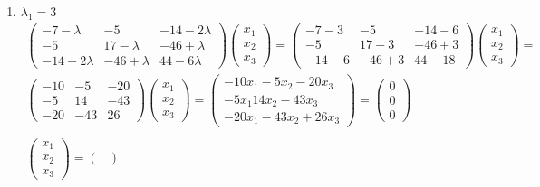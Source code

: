 		\begin{enumerate}
		\item $\lambda_1 = 3$
			\begin{gather*}
				\begin{pmatrix}
					-7-\lambda & -5 & -14-2\lambda\\
					-5 & 17-\lambda & -46+\lambda\\
					-14-2\lambda & -46+\lambda & 44-6\lambda
				\end{pmatrix}	
				\begin{pmatrix}
					x_1 \\ x_2 \\ x_3
				\end{pmatrix}
				=
				\begin{pmatrix}
					-7-3 & -5 & -14-6\\
					-5 & 17-3 & -46+3\\
					-14-6 & -46+3 & 44-18
				\end{pmatrix}	
				\begin{pmatrix}
					x_1 \\ x_2 \\ x_3
				\end{pmatrix}
				=\\
				\begin{pmatrix}
					-10 & -5 & -20\\
					-5 & 14 & -43\\
					-20 & -43 & 26
				\end{pmatrix}	
				\begin{pmatrix}
					x_1 \\ x_2 \\ x_3
				\end{pmatrix}
				=
				\begin{pmatrix}
					-10x_1 -5x_2  -20x_3\\
					-5x_1 14x_2  -43x_3\\
					-20x_1  -43x_2 +26x_3
				\end{pmatrix}
				=
				\begin{pmatrix}
					0 \\ 0 \\ 0
				\end{pmatrix}\\
				\\
				\begin{pmatrix}
					x_1 \\ x_2 \\ x_3
				\end{pmatrix}
				=
				\begin{pmatrix}

\end{pmatrix}
\end{gather*}
\end{enumerate}
